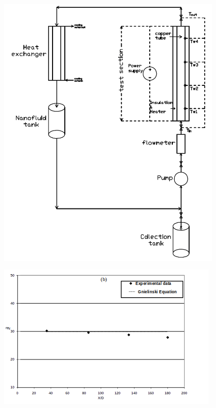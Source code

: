 \documentclass{article}
\begin{document}


\appendix

\begin{figure}
	\centering
	\includegraphics[width=0.9\linewidth]{fig1}
	\caption{}
	\label{fig:fig1}
\end{figure}



\begin{figure}
	\centering
	\includegraphics[width=0.8\linewidth]{fig3}
	\caption{}
	\label{fig:fig3}
\end{figure}
\end{document}
